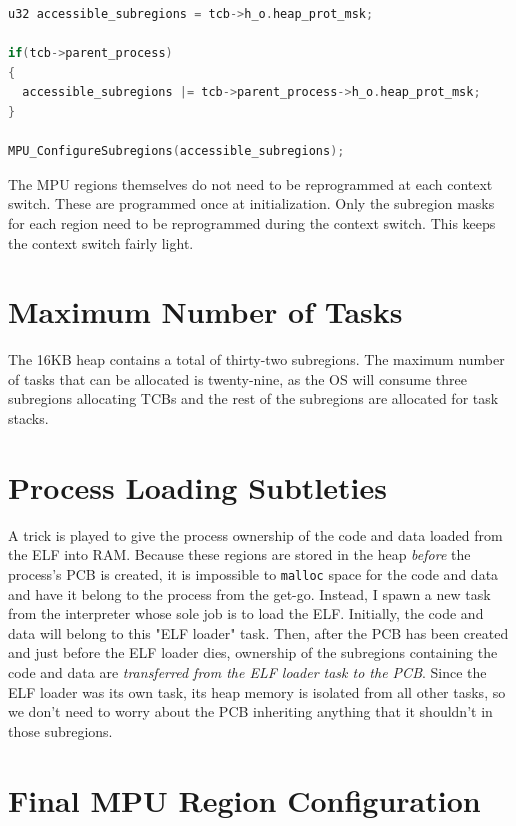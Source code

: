 \begin{lstlisting}[language=c, caption={Pseudo-code demonstrating how subregions are made accessible based on the TCB \textit{and} PCB.}, captionpos=b, label={lst:subregions}, float]
u32 accessible_subregions = tcb->h_o.heap_prot_msk;

if(tcb->parent_process)
{
  accessible_subregions |= tcb->parent_process->h_o.heap_prot_msk;
}

MPU_ConfigureSubregions(accessible_subregions);

\end{lstlisting}

The MPU regions themselves do not need to be reprogrammed at each context switch. These are programmed once at initialization. Only the subregion masks for each region need to be reprogrammed during the context switch. This keeps the context switch fairly light.

\section{Maximum Number of Tasks}

The 16KB heap contains a total of thirty-two subregions. The maximum number of tasks that can be allocated is twenty-nine, as the OS will consume three subregions allocating TCBs and the rest of the subregions are allocated for task stacks.

\section{Process Loading Subtleties}

A trick is played to give the process ownership of the code and data loaded from the ELF into RAM. Because these regions are stored in the heap \textit{before} the process's PCB is created, it is impossible to \texttt{malloc} space for the code and data and have it belong to the process from the get-go. Instead, I spawn a new task from the interpreter whose sole job is to load the ELF. Initially, the code and data will belong to this "ELF loader" task. Then, after the PCB has been created and just before the ELF loader dies, ownership of the subregions containing the code and data are \textit{transferred from the ELF loader task to the PCB}. Since the ELF loader was its own task, its heap memory is isolated from all other tasks, so we don't need to worry about the PCB inheriting anything that it shouldn't in those subregions.

\section{Final MPU Region Configuration}

